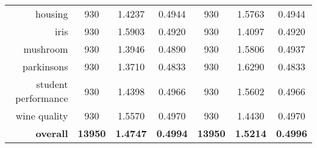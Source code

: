 \begin{table}[htbp]
{\begin{tabular}{rcccccc}
			housing                            & 930                                             & \cellcolor[rgb]{ .776,  .937,  .808}\textcolor[rgb]{ 0,  .38,  0}{1.4237}          & 0.4944          & 930                               & 1.5763                                                                    & 0.4944          \\
			iris                               & 930                                             & 1.5903                                                                             & 0.4920          & 930                               & \cellcolor[rgb]{ .776,  .937,  .808}\textcolor[rgb]{ 0,  .38,  0}{1.4097} & 0.4920          \\
			mushroom                           & 930                                             & \cellcolor[rgb]{ .776,  .937,  .808}\textcolor[rgb]{ 0,  .38,  0}{1.3946}          & 0.4890          & 930                               & 1.5806                                                                    & 0.4937          \\
			parkinsons                         & 930                                             & \cellcolor[rgb]{ .776,  .937,  .808}\textcolor[rgb]{ 0,  .38,  0}{1.3710}          & 0.4833          & 930                               & 1.6290                                                                    & 0.4833          \\
			student performance                & 930                                             & \cellcolor[rgb]{ .776,  .937,  .808}\textcolor[rgb]{ 0,  .38,  0}{1.4398}          & 0.4966          & 930                               & 1.5602                                                                    & 0.4966          \\
			wine quality                       & 930                                             & 1.5570                                                                             & 0.4970          & 930                               & \cellcolor[rgb]{ .776,  .937,  .808}\textcolor[rgb]{ 0,  .38,  0}{1.4430} & 0.4970          \\
			\midrule
			\textbf{overall}                   & \textbf{13950}                                  & \cellcolor[rgb]{ .776,  .937,  .808}\textcolor[rgb]{ 0,  .38,  0}{\textbf{1.4747}} & \textbf{0.4994} & \textbf{13950}                    & \textbf{1.5214}                                                           & \textbf{0.4996} \\
		\end{tabular}%
	}
\end{table}%


